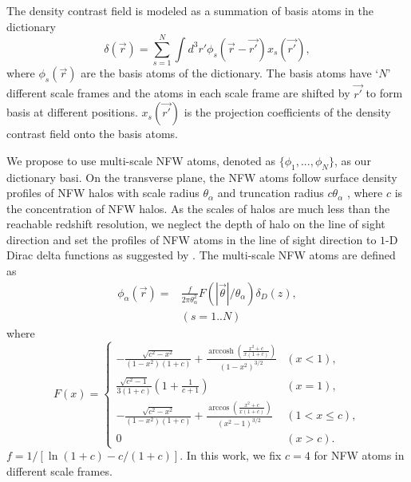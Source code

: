 \documentclass[twocolumn]{aastex62}
\DeclareMathOperator{\arccosh}{arccosh}
\begin{document}
The density contrast field is modeled as a summation of basis atoms in the dictionary
\begin{equation}\label{eq-x2delta}
\delta(\vec{r}) = \sum_{s=1}^{N} \int d^3 r' \phi_s(\vec{r}-\vec{r'}) x_s(\vec{r'}),
\end{equation}
where $\phi_s(\vec{r})$ are the basis atoms of the dictionary. The basis atoms have `$N$' different scale frames and the atoms
in each scale frame are shifted by $\vec{r'}$ to form basis at different positions. $x_s(\vec{r'})$ is the projection
coefficients of the density contrast field onto the basis atoms.

We propose to use multi-scale NFW atoms, denoted as $\{\phi_1,...,\phi_N\}$, as our dictionary basi.
On the transverse plane, the NFW atoms follow surface density profiles of NFW halos
\citep{haloModel-TJ2003-3pt} with scale radius $\theta_\alpha$ and truncation radius $c \theta_\alpha$ ,
where $c$ is the concentration of NFW halos.
As the scales of halos are much less than the reachable redshift resolution, we neglect the depth of halo on the
line of sight direction and set the profiles of NFW atoms in the line of sight direction to $1$-D Dirac delta
functions as suggested by \citep{LSS-massMap-Glimpse3D-Leonard2014}.
The multi-scale NFW atoms are defined as
\begin{equation}
\begin{split}
\phi_\alpha(\vec{r}) =&\frac{f }{2 \pi \theta_\alpha^2 } F(|\vec{\theta}|/\theta_\alpha) \delta_D(z),\\
&  (s=1..N)
\end{split}
\end{equation}
where
\begin{equation}
F(x)=
\begin{cases}
-\frac{\sqrt{c^2-x^2}}{(1-x^2)(1+c)} + \frac{\arccosh \left(\frac{x^2+c}{x(1+c)}\right)}{(1-x^2)^{3/2}}  & (x<1),\\
\frac{\sqrt{c^2-1}}{3(1+c)} (1+\frac{1}{c+1}) & (x=1),\\
-\frac{\sqrt{c^2-x^2}}{(1-x^2)(1+c)} + \frac{\arccos\left(\frac{x^2+c}{x(1+c)}\right)}{(x^2-1)^{3/2}} & (1<x\leq c),\\
0& (x>c).
\end{cases}
\end{equation}
$f=1/[\ln (1+c)-c/(1+c)]$. In this work, we fix $c=4$ for NFW atoms in different scale frames.
\end{document}
